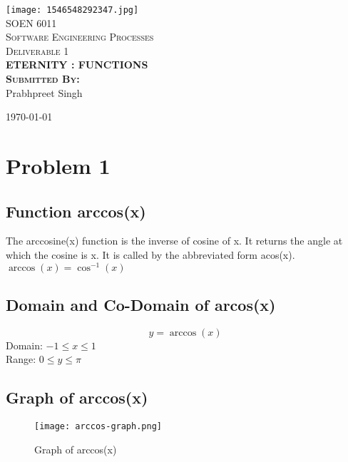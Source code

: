 \documentclass[12pt]{article}
\begin{document}
\begin{titlepage}%
\center %

\texttt{[image: 1546548292347.jpg]}\\%
\vspace{30mm}%
\textsc{\Huge SOEN 6011}\\[0.5cm] %
\textsc{\Huge Software Engineering Processes}\\

\vspace{30mm}
\textsc{\huge Deliverable 1 }\\[0.5cm]
\LARGE \textbf{ETERNITY : FUNCTIONS}\\[0.1cm]%

\vspace{30mm}
\textsc{\textbf{\LARGE{Submitted By:}}}\\
\LARGE{Prabhpreet Singh}\\ 
\vspace{20mm}


\vfill %
{\large \today}\\[1cm] %
\end{titlepage}
\tableofcontents%
\listoffigures%
\newpage %

\section{Problem 1} %
\subsection{Function arccos(x)} %
The arccosine(x) function is the inverse of cosine of x. It returns the angle at which the cosine is x. It is called by the abbreviated form acos(x). $\arccos(x) = \cos^{-1}(x)$
\subsection{Domain and Co-Domain of arcos(x)}
\begin{equation} %
y = \arccos(x)
\end{equation}
Domain: $-1\leq x \leq1$\\Range: $0 \leq y \leq \pi$
\subsection{Graph of arccos(x)}
    \begin{figure}[h]%
        \centering %
        \texttt{[image: arccos-graph.png]}
        \caption{{Graph of arccos(x)}}
        \label{fig:{Arccos(x)}}
    \end{figure}
\end{document}
